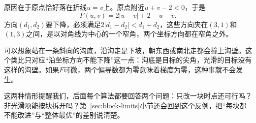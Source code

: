 原因在于原点恰好落在折线$u=v$上。原点附近$u+v-2<0$，于是
\[
 F(u,v)=2\lvert u-v\rvert+2-u-v .
\]
方向$(d_1,d_2)$要下降，必须满足$2\lvert d_1-d_2\rvert<d_1+d_2$，这些方向夹在$(3,1)$和$(1,3)$之间，是以对角线为中心的一个窄角，两个坐标方向都在窄角之外。

可以想象站在一条斜向的沟底，沿沟走是下坡，朝东西或南北走都会撞上沟壁。这个类比只对应“沿坐标方向不能下降”这一点：沟底是目标的尖角，光滑的目标没有这样的沟壁。如果$F$可微，两个偏导数都为零意味着梯度为零，这种事就不会发生。

这两种情形提醒我们，后面每个算法都要回答两个问题：只改一块时点还可行吗？非光滑项能按块拆开吗？第~\ref{sec:block-limits}小节还会回到这个反例，把“每块都不能改进”与“整体最优”的差别说清楚。
